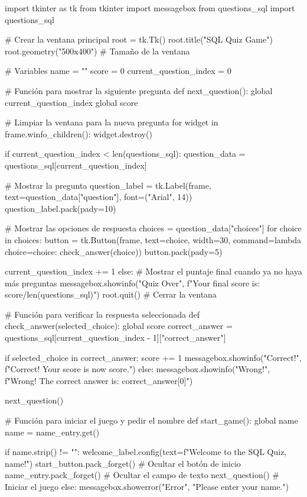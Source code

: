 import tkinter as tk
from tkinter import messagebox
from questions_sql import questions_sql

# Crear la ventana principal
root = tk.Tk()
root.title("SQL Quiz Game")
root.geometry("500x400")  # Tamaño de la ventana

# Variables
name = ""
score = 0
current_question_index = 0

# Función para mostrar la siguiente pregunta
def next_question():
    global current_question_index
    global score

    # Limpiar la ventana para la nueva pregunta
    for widget in frame.winfo_children():
        widget.destroy()

    if current_question_index < len(questions_sql):
        question_data = questions_sql[current_question_index]
        
        # Mostrar la pregunta
        question_label = tk.Label(frame, text=question_data["question"], font=("Arial", 14))
        question_label.pack(pady=10)
        
        # Mostrar las opciones de respuesta
        choices = question_data["choices"]
        for choice in choices:
            button = tk.Button(frame, text=choice, width=30, command=lambda choice=choice: check_answer(choice))
            button.pack(pady=5)
        
        current_question_index += 1
    else:
        # Mostrar el puntaje final cuando ya no haya más preguntas
        messagebox.showinfo("Quiz Over", f"Your final score is: {score}/{len(questions_sql)}")
        root.quit()  # Cerrar la ventana

# Función para verificar la respuesta seleccionada
def check_answer(selected_choice):
    global score
    correct_answer = questions_sql[current_question_index - 1]["correct_answer"]
    
    if selected_choice in correct_answer:
        score += 1
        messagebox.showinfo("Correct!", f"Correct! Your score is now {score}.")
    else:
        messagebox.showinfo("Wrong!", f"Wrong! The correct answer is: {correct_answer[0]}")
    
    next_question()

# Función para iniciar el juego y pedir el nombre
def start_game():
    global name
    name = name_entry.get()
    
    if name.strip() != "":
        welcome_label.config(text=f"Welcome to the SQL Quiz, {name}!")
        start_button.pack_forget()  # Ocultar el botón de inicio
        name_entry.pack_forget()    # Ocultar el campo de texto
        next_question()  # Iniciar el juego
    else:
        messagebox.showerror("Error", "Please enter your name.")

